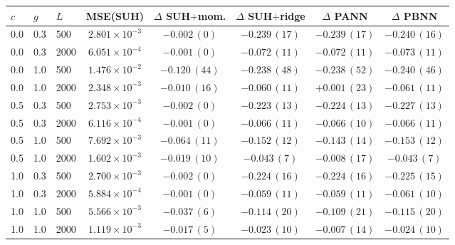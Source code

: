 \begin{tabular}{lllccccc}
\hline\hline
$c$ & $g$ & $L$ & MSE(SUH) & $\Delta$ SUH$+$mom. & $\Delta$ SUH$+$ridge & $\Delta$ PANN & $\Delta$ PBNN\\
\hline
0.0 & 0.3 & 500 & $2.801{\times}10^{-3}$ & $-0.002\,(0)$ & $-0.239\,(17)$ & $-0.239\,(17)$ & $-0.240\,(16)$\\
0.0 & 0.3 & 2000 & $6.051{\times}10^{-4}$ & $-0.001\,(0)$ & $-0.072\,(11)$ & $-0.072\,(11)$ & $-0.073\,(11)$\\
0.0 & 1.0 & 500 & $1.476{\times}10^{-2}$ & $-0.120\,(44)$ & $-0.238\,(48)$ & $-0.238\,(52)$ & $-0.240\,(46)$\\
0.0 & 1.0 & 2000 & $2.348{\times}10^{-3}$ & $-0.010\,(16)$ & $-0.060\,(11)$ & $+0.001\,(23)$ & $-0.061\,(11)$\\
0.5 & 0.3 & 500 & $2.753{\times}10^{-3}$ & $-0.002\,(0)$ & $-0.223\,(13)$ & $-0.224\,(13)$ & $-0.227\,(13)$\\
0.5 & 0.3 & 2000 & $6.116{\times}10^{-4}$ & $-0.001\,(0)$ & $-0.066\,(11)$ & $-0.066\,(10)$ & $-0.066\,(11)$\\
0.5 & 1.0 & 500 & $7.692{\times}10^{-3}$ & $-0.064\,(11)$ & $-0.152\,(12)$ & $-0.143\,(14)$ & $-0.153\,(12)$\\
0.5 & 1.0 & 2000 & $1.602{\times}10^{-3}$ & $-0.019\,(10)$ & $-0.043\,(7)$ & $-0.008\,(17)$ & $-0.043\,(7)$\\
1.0 & 0.3 & 500 & $2.700{\times}10^{-3}$ & $-0.002\,(0)$ & $-0.224\,(16)$ & $-0.224\,(16)$ & $-0.225\,(15)$\\
1.0 & 0.3 & 2000 & $5.884{\times}10^{-4}$ & $-0.001\,(0)$ & $-0.059\,(11)$ & $-0.059\,(11)$ & $-0.061\,(10)$\\
1.0 & 1.0 & 500 & $5.566{\times}10^{-3}$ & $-0.037\,(6)$ & $-0.114\,(20)$ & $-0.109\,(21)$ & $-0.115\,(20)$\\
1.0 & 1.0 & 2000 & $1.119{\times}10^{-3}$ & $-0.017\,(5)$ & $-0.023\,(10)$ & $-0.007\,(14)$ & $-0.024\,(10)$\\
\hline\hline
\end{tabular}
